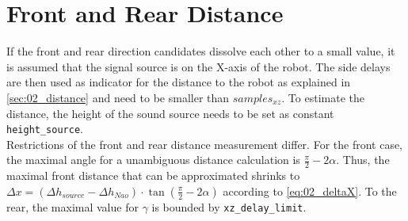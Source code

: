 \section{Front and Rear Distance}
\label{sec:03_distance}

If the front and rear direction candidates dissolve each other to a small
value, it is assumed that the signal source is on the X-axis of the robot.
The side delays are then used as indicator for the distance to the robot as
explained in \ref{sec:02_distance} and need to be smaller than
 $samples_{xz}$.
To estimate the distance, the height of the sound source needs to be set as
constant  \lstinline!height_source!.\\
Restrictions of the front and rear distance measurement differ.
For the front case, the maximal angle for a unambiguous distance calculation
is $\frac{\pi}{2}- 2\alpha$.
Thus, the maximal front distance that can be approximated shrinks to
$\Delta x = (\Delta h_{source} - \Delta h_{Nao}) \cdot \tan(\frac{\pi}{2} - 2\alpha)$
according to \ref{eq:02_deltaX}.
To the rear, the maximal value for $\gamma$ is bounded by 
\lstinline!xz_delay_limit!.

